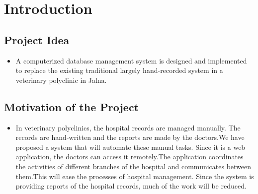 \documentclass[oneside,a4paper,12pt]{book}
\begin{document}
			
\chapter{Introduction}
\section{Project Idea}
\begin{itemize}
\item A computerized database management system is designed and implemented to replace the existing traditional largely hand-recorded system in a veterinary polyclinic in Jalna.
\end{itemize}


\section{Motivation of the Project}  
\begin{itemize}
\item In veterinary polyclinics, the hospital records are managed manually. The records are hand-written and the reports are made by the doctors.We have proposed a system that will automate these manual tasks. Since it is a web application, the doctors can access it remotely.The application coordinates the activities of different branches of the hospital and communicates between them.This will ease the processes of hospital management. Since the system is providing reports of the hospital records, much of the work will be reduced.
\end{itemize}
\end{document}

